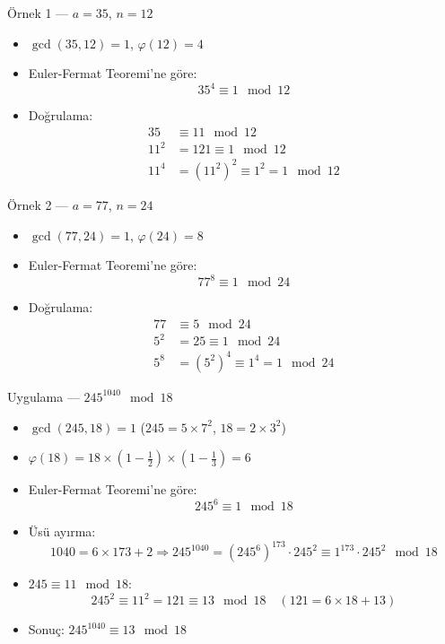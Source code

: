 \documentclass{beamer}
\begin{document}
\begin{frame}{Örnek 1 — $a = 35$, $n = 12$}
  \begin{itemize}
    \item $\gcd(35, 12) = 1$, $\varphi(12) = 4$
    \item Euler-Fermat Teoremi'ne göre:
    \[
      35^4 \equiv 1 \mod 12
    \]
    \item Doğrulama:
    \begin{align*}
      35 &\equiv 11 \mod 12 \\
      11^2 &= 121 \equiv 1 \mod 12 \\
      11^4 &= (11^2)^2 \equiv 1^2 = 1 \mod 12
    \end{align*}
  \end{itemize}
\end{frame}

\begin{frame}{Örnek 2 — $a = 77$, $n = 24$}
  \begin{itemize}
    \item $\gcd(77, 24) = 1$, $\varphi(24) = 8$
    \item Euler-Fermat Teoremi'ne göre:
    \[
      77^8 \equiv 1 \mod 24
    \]
    \item Doğrulama:
    \begin{align*}
      77 &\equiv 5 \mod 24 \\
      5^2 &= 25 \equiv 1 \mod 24 \\
      5^8 &= (5^2)^4 \equiv 1^4 = 1 \mod 24
    \end{align*}
  \end{itemize}
\end{frame}

\begin{frame}{Uygulama — $245^{1040} \mod 18$}
  \begin{itemize}
    \item $\gcd(245,18)=1$ ($245=5\times 7^2$, $18=2\times 3^2$)
    \item $\varphi(18) = 18 \times (1-\frac{1}{2}) \times (1-\frac{1}{3}) = 6$
    \item Euler-Fermat Teoremi'ne göre:
    \[
      245^6 \equiv 1 \mod 18
    \]
    \item Üsü ayırma:
    \[
      1040 = 6 \times 173 + 2 \Rightarrow 245^{1040} = (245^6)^{173} \cdot 245^2 \equiv 1^{173} \cdot 245^2 \mod 18
    \]
    \item $245 \equiv 11 \mod 18$:
    \[
      245^2 \equiv 11^2 = 121 \equiv 13 \mod 18 \quad (121 = 6 \times 18 + 13)
    \]
    \item Sonuç: $245^{1040} \equiv 13 \mod 18$
  \end{itemize}
\end{frame}
\end{document}
